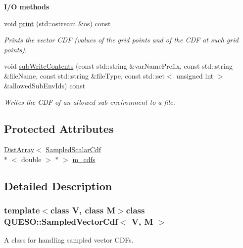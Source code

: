 \begin{Indent}{\bf I/\-O methods}\par
\begin{DoxyCompactItemize}
\item 
void \hyperlink{class_q_u_e_s_o_1_1_sampled_vector_cdf_a9d62ca801a3d52b18188ae93b476c847}{print} (std\-::ostream \&os) const 
\begin{DoxyCompactList}\small\item\em Prints the vector C\-D\-F (values of the grid points and of the C\-D\-F at such grid points). \end{DoxyCompactList}\item 
void \hyperlink{class_q_u_e_s_o_1_1_sampled_vector_cdf_acae1453895e364bf726ef60f8fde1bd8}{sub\-Write\-Contents} (const std\-::string \&var\-Name\-Prefix, const std\-::string \&file\-Name, const std\-::string \&file\-Type, const std\-::set$<$ unsigned int $>$ \&allowed\-Sub\-Env\-Ids) const 
\begin{DoxyCompactList}\small\item\em Writes the C\-D\-F of an allowed sub-\/environment to a file. \end{DoxyCompactList}\end{DoxyCompactItemize}
\end{Indent}
\subsection*{Protected Attributes}
\begin{DoxyCompactItemize}
\item 
\hyperlink{class_q_u_e_s_o_1_1_dist_array}{Dist\-Array}$<$ \hyperlink{class_q_u_e_s_o_1_1_sampled_scalar_cdf}{Sampled\-Scalar\-Cdf}\\*
$<$ double $>$ $\ast$ $>$ \hyperlink{class_q_u_e_s_o_1_1_sampled_vector_cdf_ab1bc899ffdea9ca7e635312f82ff169f}{m\-\_\-cdfs}
\end{DoxyCompactItemize}


\subsection{Detailed Description}
\subsubsection*{template$<$class V, class M$>$class Q\-U\-E\-S\-O\-::\-Sampled\-Vector\-Cdf$<$ V, M $>$}

A class for handling sampled vector C\-D\-Fs. 

